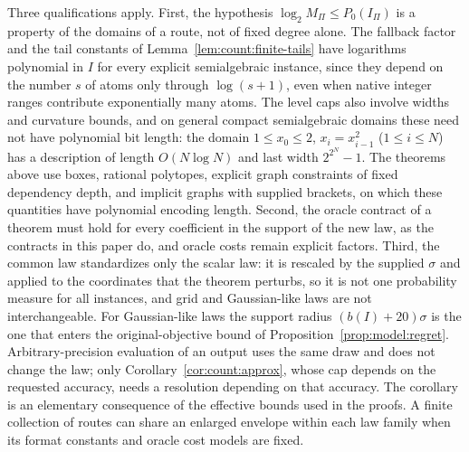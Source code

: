 Three qualifications apply. First, the hypothesis
$\log_2M_\Pi\le P_0(I_\Pi)$ is a property of the domains of a route, not of
fixed degree alone. The fallback factor and the tail constants of
Lemma~\ref{lem:count:finite-tails} have logarithms polynomial in $I$ for
every explicit semialgebraic instance, since they depend on the number $s$ of
atoms only through $\log(s+1)$, even when native integer ranges contribute
exponentially many atoms. The level caps also involve widths and curvature
bounds, and on general compact semialgebraic domains these need not have
polynomial bit length: the domain $1\le x_0\le2$, $x_i=x_{i-1}^2$
($1\le i\le N$) has a description of length $O(N\log N)$ and last width
$2^{2^N}-1$. The theorems above use boxes, rational polytopes, explicit graph
constraints of fixed dependency depth, and implicit graphs with supplied
brackets, on which these quantities have polynomial encoding length. Second,
the oracle contract of a theorem must hold for every coefficient in the
support of the new law, as the contracts in this paper do, and oracle costs
remain explicit factors. Third, the common law standardizes only the scalar
law: it is rescaled by the supplied $\sigma$ and applied to the coordinates
that the theorem perturbs, so it is not one probability measure for all
instances, and grid and Gaussian-like laws are not interchangeable. For
Gaussian-like laws the support radius $(b(I)+20)\sigma$ is the one that
enters the original-objective bound of Proposition~\ref{prop:model:regret}.
Arbitrary-precision evaluation of an output uses the same draw and does not
change the law; only Corollary~\ref{cor:count:approx}, whose cap depends on
the requested accuracy, needs a resolution depending on that accuracy. The
corollary is an elementary consequence of the effective bounds used in the
proofs. A finite collection of routes can share an enlarged envelope within
each law family when its format constants and oracle cost models are fixed.
